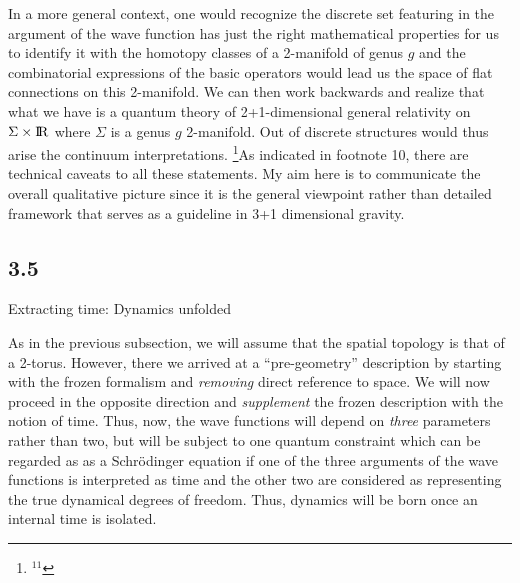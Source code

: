 In a more general context, one would recognize the discrete set featuring
in the argument of the wave function has just the right mathematical
properties for us to identify it with the homotopy classes of a 2-manifold
of genus $g$ and the combinatorial expressions of the basic operators would
lead us the space of flat connections on this 2-manifold. We can then work
backwards and realize that what we have is a quantum theory of 2+1-dimensional
general relativity on $\Sigma\times{\rm I\!R}$ where $\Sigma$ is a genus $g$
2-manifold. Out of discrete structures would thus arise the continuum
interpretations.%
\footnote{$^{11}$}{As indicated in footnote 10, there are technical
caveats to all these statements. My aim here is to communicate the overall
qualitative picture since it is the general viewpoint rather than detailed
framework that serves as a guideline in 3+1 dimensional gravity.}

\goodbreak
\subsection{3.5}{Extracting time: Dynamics unfolded}%

As in the previous subsection, we will assume that the spatial topology is
that of a 2-torus. However, there we arrived at a ``pre-geometry''
description by starting with the frozen formalism and {\it removing} direct
reference to space. We will now proceed in the opposite direction and {\it
supplement} the frozen description with the notion of time. Thus, now, the wave
functions will depend on {\it three} parameters rather than two, but will be
subject to one quantum constraint which can be regarded as as a Schr\"odinger
equation if one of the three arguments of the wave functions is interpreted
as time and the other two are considered as representing the true dynamical
degrees of freedom. Thus, dynamics will be born once an internal time is
isolated.

